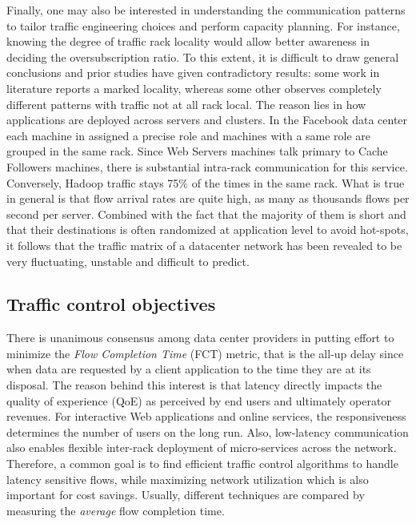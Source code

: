 Finally, one may also be interested in understanding the communication patterns to tailor traffic engineering choices and perform capacity planning. For instance, knowing the degree of traffic rack locality would allow better awareness in deciding the oversubscription ratio. To this extent, it is difficult to draw general conclusions and prior studies have given contradictory results: some work in literature \cite{net-traffic-characteristics-benson} reports a marked locality, whereas some other observes completely different patterns with traffic not at all rack local. The reason lies in how applications are deployed across servers and clusters. In the Facebook data center each machine in assigned a precise role and machines with a same role are grouped in the same rack. Since Web Servers machines talk primary to Cache Followers machines, there is substantial intra-rack communication for this service. Conversely, Hadoop traffic stays 75\% of the times in the same rack.
What is true in general is that flow arrival rates are quite high, as many as thousands flows per second per server. Combined with the fact that the majority of them is short and that their destinations is often randomized at application level to avoid hot-spots, it follows that the traffic matrix of a datacenter network has been revealed to be very fluctuating, unstable and difficult to predict. 

\subsection{Traffic control objectives}
There is unanimous consensus among data center providers in putting effort to minimize the \textit{Flow Completion Time} (FCT) metric, that is the all-up delay since when data are requested by a client application to the time they are at its disposal. The reason behind this interest is that latency directly impacts the quality of experience (QoE) as perceived by end users and ultimately operator revenues.  For interactive Web applications and online services, the responsiveness determines the number of users on the long run. Also, low-latency communication also enables flexible inter-rack deployment of micro-services across the network. Therefore, a common goal is to find efficient traffic control algorithms to handle latency sensitive flows, while maximizing network utilization which is also important for cost savings. Usually, different techniques are compared by measuring the \emph{average} flow completion time.\\

